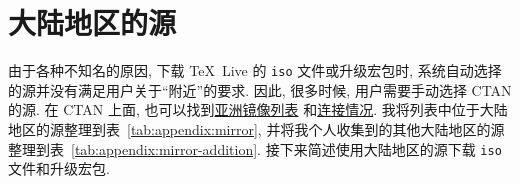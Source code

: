 
\chapter{大陆地区的源}\label{chp:appendix:mirror}

由于各种不知名的原因,
下载 \TeX\ Live 的 \texttt{iso} 文件或升级宏包时,
系统自动选择的源并没有满足用户关于``附近''的要求.
因此,
很多时候,
用户需要手动选择 CTAN 的源.
在 CTAN 上面,
也可以找到\href{https://ctan.org/mirrors#Asia}{亚洲镜像列表}%
和\href{https://ctan.org/mirrors/mirmon#cn}{连接情况}.
我将列表中位于大陆地区的源整理到表~\ref{tab:appendix:mirror},
并将我个人收集到的其他大陆地区的源整理到表~\ref{tab:appendix:mirror-addition}.
接下来简述使用大陆地区的源下载 \texttt{iso} 文件和升级宏包.

